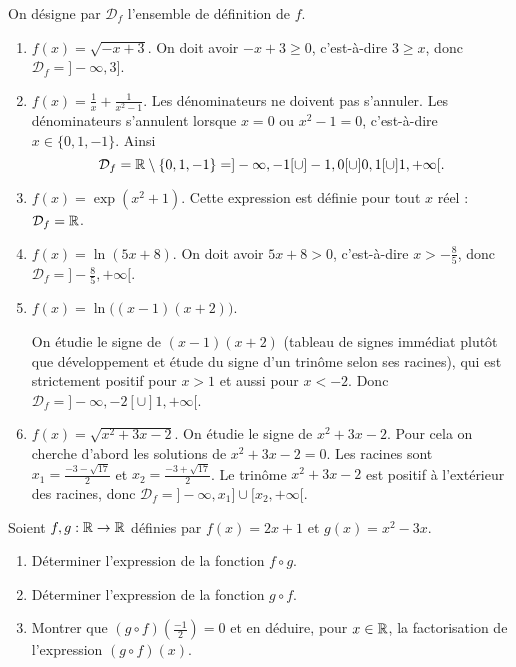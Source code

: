 \documentclass[11pt,class=report,crop=false]{standalone}
\begin{document}
\correction
On désigne par $\mathcal{D}_f$ l'ensemble de définition de $f$.
\begin{enumerate}
    \item $f(x) = \sqrt{-x+3}$.
    On doit avoir $-x+3\ge0$, c'est-à-dire $3 \ge x$, donc $\mathcal{D}_f = ]-\infty,3]$.
    
    \item $f(x) = \frac{1}{x} + \frac{1}{x^2-1}$.
    Les dénominateurs ne doivent pas s'annuler.
    Les dénominateurs s'annulent lorsque $x = 0$ ou $x^2-1 = 0$, c'est-à-dire 
    $x \in \{0,1,-1\}$. 
    Ainsi 
    $$\mathcal{D}_f = \mathbb{R} \setminus \{0,1,-1\} = ]-\infty,-1[ \cup ]-1,0[ \cup ]0,1[ \cup ]1,+\infty[.$$
    
    
    \item $f(x) = \exp(x^2+1)$.
    Cette expression est définie pour tout $x$ réel :  $\mathcal{D}_f = \mathbb{R}$.
    
    \item $f(x) = \ln( 5x + 8 )$.
    On doit avoir $5x+8 > 0$, c'est-à-dire $x > -\frac85$, donc $\mathcal{D}_f = ]-\frac85,+\infty[$.
    
    \item $f(x) = \ln\big( (x-1)(x+2) \big)$.
    
    On étudie le signe de $(x-1)(x+2)$ (tableau de signes immédiat plutôt que développement et étude du signe d'un trinôme selon ses racines), qui est strictement positif pour $x>1$ et aussi pour $x<-2$.
    Donc $\mathcal{D}_f = ]-\infty,-2[ \cup ]1,+\infty[$.
    
    \item $f(x) = \sqrt{ x^2+3x-2 }$.
    On étudie le signe de $x^2+3x-2$. Pour cela on cherche d'abord les solutions de $x^2+3x-2=0$.
    Les racines sont  $x_1 = \frac{-3 - \sqrt{17}}{2}$ et $x_2 = \frac{-3 + \sqrt{17}}{2}$.
    Le trinôme $x^2+3x-2$ est positif à l'extérieur des racines, donc 
    $\mathcal{D}_f = ]-\infty,x_1] \cup [x_2,+\infty[$.
    
\end{enumerate} 
\fincorrection
\finexercice



\exercice{}
\enonce
Soient $f,g : \mathbb{R} \to \mathbb{R}$ définies par $f(x)=2x+1$ et $g(x)=x^2-3x$.
\begin{enumerate}
    \item Déterminer l'expression de la fonction $f \circ g$.
    \item Déterminer l'expression de la fonction $g \circ f$.
    \item Montrer que $(g\circ f)(\frac{-1}{2})=0$ et en déduire, pour $x\in \mathbb{R}$, la factorisation de l'expression $(g \circ f)(x)$.      
\end{enumerate} 
\finenonce
\end{document}
